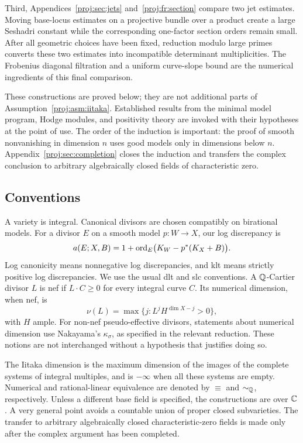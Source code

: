 Third, Appendices~\ref{proj:sec:jets} and~\ref{proj:fr:section} compare two jet
estimates. Moving base-locus estimates on a projective bundle over a
product create a large Seshadri constant while the corresponding
one-factor section orders remain small. After all geometric choices
have been fixed, reduction modulo large primes converts these two
estimates into incompatible determinant multiplicities. The Frobenius
diagonal filtration and a uniform curve-slope bound are the numerical
ingredients of this final comparison.

These constructions are proved below; they are not additional parts
of Assumption~\ref{proj:asm:iitaka}. Established results from the minimal
model program, Hodge modules, and positivity theory are invoked with
their hypotheses at the point of use. The order of the induction is
important: the proof of smooth nonvanishing in dimension \(n\) uses
good models only in dimensions below \(n\).
Appendix~\ref{proj:sec:completion} closes the induction and transfers the
complex conclusion to arbitrary algebraically closed fields of
characteristic zero.

\subsection{Conventions}

A variety is integral. Canonical divisors are chosen compatibly on
birational models. For a divisor \(E\) on a smooth model
\(p:W\to X\), our log discrepancy is
\[
 a(E;X,B)=1+\operatorname{ord}_E\bigl(K_W-p^*(K_X+B)\bigr).
\]
Log canonicity means nonnegative log discrepancies, and klt means
strictly positive log discrepancies. We use the usual dlt and slc
conventions. A \(\mathbb{Q}\)-Cartier divisor \(L\) is nef if \(L\cdot C\ge0\)
for every integral curve \(C\). Its numerical dimension, when nef, is
\[
 \nu(L)=\max\{j: L^jH^{\dim X-j}>0\},
\]
with \(H\) ample. For non-nef pseudo-effective divisors, statements
about numerical dimension use Nakayama's \(\kappa_\sigma\), as
specified in the relevant reduction. These notions are not
interchanged without a hypothesis that justifies doing so.

The Iitaka dimension is the maximum dimension of the images of the
complete systems of integral multiples, and is \(-\infty\) when all
these systems are empty. Numerical and rational-linear equivalence
are denoted by \(\equiv\) and \(\sim_{\mathbb{Q}}\), respectively. Unless a
different base field is specified, the constructions are over \(\mathbb{C}\).
A very general point avoids a countable union of proper closed
subvarieties. The transfer to arbitrary algebraically closed
characteristic-zero fields is made only after the complex argument
has been completed.
